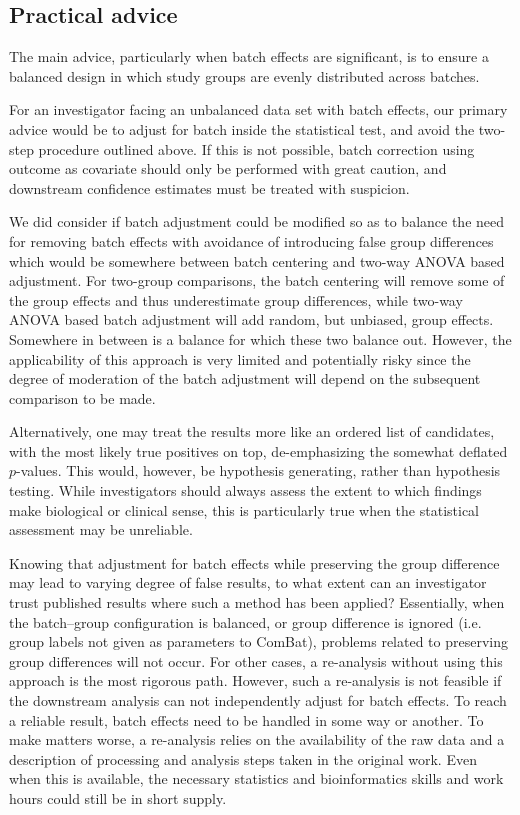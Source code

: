 \documentclass{bio}
\begin{document}
\subsection{Practical advice}

The main advice, particularly when batch effects are significant, is to ensure a balanced design in which study groups are evenly distributed across batches.

For an investigator facing an unbalanced data set with batch effects, our primary advice would be to adjust for batch inside the statistical test, and avoid the two-step procedure outlined above. If this is not possible, batch correction using outcome as covariate should only be performed with great caution, and downstream confidence estimates must be treated with suspicion.

We did consider if batch adjustment could be modified so as to balance the need for removing batch effects with avoidance of introducing false group differences which would be somewhere between batch centering and two-way ANOVA based adjustment. For two-group comparisons, the batch centering will remove some of the group effects and thus underestimate group differences, while two-way ANOVA based batch adjustment will add random, but unbiased, group effects. Somewhere in between is a balance for which these two balance out. However, the applicability of this approach is very limited and potentially risky since the degree of moderation of the batch adjustment will depend on the subsequent comparison to be made.

Alternatively, one may treat the results more like an ordered list of candidates, with the most likely true positives on top, de-emphasizing the somewhat deflated $p$-values. This would, however, be hypothesis generating, rather than hypothesis testing. While investigators should always assess the extent to which findings make biological or clinical sense, this is particularly true when the statistical assessment may be unreliable.

Knowing that adjustment for batch effects while preserving the group difference may lead to varying degree of false results, to what extent can an investigator trust published results where such a method has been applied? Essentially, when the batch--group configuration is balanced, or group difference is ignored  (i.e. group labels not given as parameters to ComBat), problems related to preserving group differences will not occur. For other cases, a re-analysis without using this approach is the most rigorous path. However, such a re-analysis is not feasible if the downstream  analysis can not independently adjust for batch effects. To reach a reliable result, batch effects need to be handled in some way or another. To make matters worse, a re-analysis relies on the availability of the raw data and a description of processing and analysis steps taken in the original work. Even when this is available, the necessary statistics and bioinformatics skills and work hours could still be in short supply.
\end{document}
